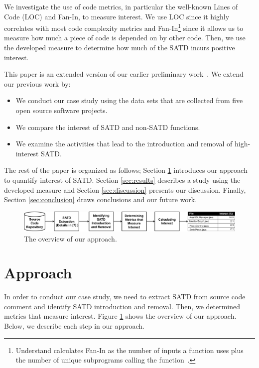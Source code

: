 \documentclass[10pt, conference]{IEEEtran}
\begin{document}
We investigate the use of code metrics, in particular the well-known Lines of Code (LOC) and Fan-In, to measure interest. We use LOC since it highly correlates with most code complexity metrics and Fan-In\footnote{{\sc Understand} calculates Fan-In as the number of inputs a function uses plus the number of unique subprograms calling the function~\cite{FANIN}.} since it allows us to measure how much a piece of code is depended on by other code. Then, we use the developed measure to determine how much of the SATD incurs positive interest. 

This paper is an extended version of our earlier preliminary work~\cite{Kamei2016TDA}. We extend our previous work by:

\begin{itemize}
\item We conduct our case study using the data sets that are collected from five open source software projects.
\item We compare the interest of SATD and non-SATD functions.
\item We examine the activities that lead to the introduction and removal of high-interest SATD.  
\end{itemize}

The rest of the paper is organized as follows; Section \ref{sec:approach} introduces our approach to quantify interest of SATD. Section \ref{sec:results} describes a study using the developed measure and Section \ref{sec:discussion} presents our discussion. Finally, Section \ref{sec:conclusion} draws conclusions and our future work.

\begin{figure}[!t]
  \begin{center}
  \includegraphics[width=.95\textwidth]{figures/overview}
  \caption{The overview of our approach.}
  \label{fig:overview}
  \end{center}
\end{figure}

\section{Approach} \label{sec:approach}
In order to conduct our case study, we need to extract SATD from source code comment and identify SATD introduction and removal. Then, we determined metrics that measure interest. Figure \ref{fig:overview} shows the overview of our approach. Below, we describe each step in our approach.
\end{document}
